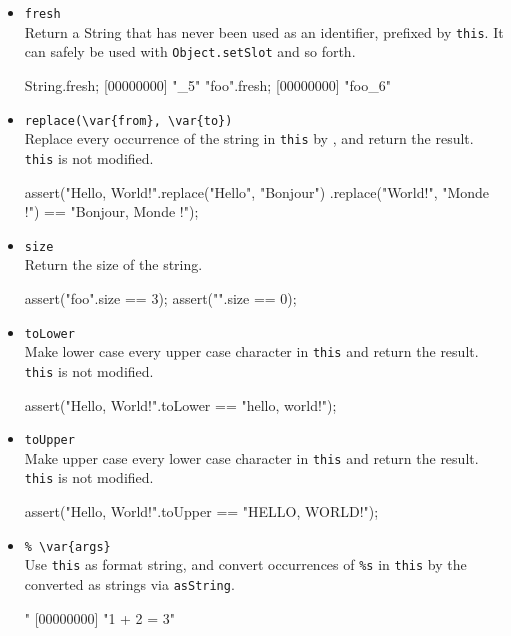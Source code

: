 \begin{itemize}
\item \lstinline|fresh|\\
  Return a String that has never been used as an identifier, prefixed
  by \lstinline|this|.  It can safely be used with
  \lstinline|Object.setSlot| and so forth.
\begin{urbiscript}[firstnumber=last]
String.fresh;
[00000000] "_5"
"foo".fresh;
[00000000] "foo_6"
\end{urbiscript}

\item \lstinline|replace(\var{from}, \var{to})|\\
  Replace every occurrence of the string  in
  \lstinline|this| by , and return the result.
  \lstinline|this| is not modified.
\begin{urbiscript}[firstnumber=last]
assert("Hello, World!".replace("Hello", "Bonjour")
                      .replace("World!", "Monde !")
       == "Bonjour, Monde !");
\end{urbiscript}

\item \lstinline|size|\\
  Return the size of the string.
\begin{urbiscript}[firstnumber=last]
assert("foo".size == 3);
assert("".size == 0);
\end{urbiscript}

\item \lstinline|toLower|\\
  Make lower case every upper case character in \lstinline|this| and
  return the result.  \lstinline|this| is not modified.
\begin{urbiscript}[firstnumber=last]
assert("Hello, World!".toLower == "hello, world!");
\end{urbiscript}

\item \lstinline|toUpper|\\
  Make upper case every lower case character in \lstinline|this| and
  return the result.  \lstinline|this| is not modified.
\begin{urbiscript}[firstnumber=last]
assert("Hello, World!".toUpper == "HELLO, WORLD!");
\end{urbiscript}

\item \lstinline|% \var{args}|\\
  Use \lstinline|this| as format string, and convert occurrences of
  \lstinline|%s| in \lstinline|this| by the  converted as
  strings via \lstinline|asString|.
\begin{urbiscript}[firstnumber=last]
"%
[00000000] "1 + 2 = 3"
\end{urbiscript}


\end{itemize}
